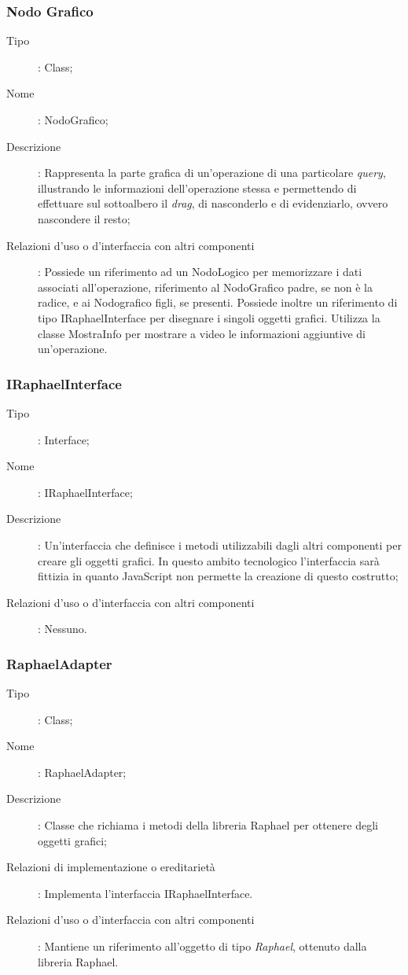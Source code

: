 \subsubsection{Nodo Grafico}
\begin{description}
\item[Tipo]: Class;
\item[Nome]: NodoGrafico;
\item[Descrizione]: Rappresenta la parte grafica di un'operazione di una particolare \textit{query}, illustrando le informazioni dell'operazione stessa e permettendo di effettuare sul sottoalbero il \textit{drag}, di nasconderlo e di evidenziarlo, ovvero nascondere il resto;
\item[Relazioni d'uso o d'interfaccia con altri componenti]: Possiede un riferimento ad un NodoLogico per memorizzare i dati associati all'operazione, riferimento al NodoGrafico padre, se non è la radice, e ai Nodografico figli, se presenti. Possiede inoltre un riferimento di tipo IRaphaelInterface per disegnare i singoli oggetti grafici. Utilizza la classe MostraInfo per mostrare a video le informazioni aggiuntive di un'operazione.
\end{description}
\subsubsection{IRaphaelInterface}
\begin{description}
\item[Tipo]: Interface;
\item[Nome]: IRaphaelInterface;
\item[Descrizione]: Un'interfaccia che definisce i metodi utilizzabili dagli altri componenti per creare gli oggetti grafici. In questo ambito tecnologico l'interfaccia sarà fittizia in quanto JavaScript non permette la creazione di questo costrutto;
\item[Relazioni d'uso o d'interfaccia con altri componenti]: Nessuno.
\end{description}
\subsubsection{RaphaelAdapter}
\begin{description}
\item[Tipo]: Class;
\item[Nome]: RaphaelAdapter;
\item[Descrizione]: Classe che richiama i metodi della libreria Raphael per ottenere degli oggetti grafici;
\item[Relazioni di implementazione o ereditarietà]: Implementa l'interfaccia IRaphaelInterface.
\item[Relazioni d'uso o d'interfaccia con altri componenti]: Mantiene un riferimento all'oggetto di tipo \textit{Raphael}, ottenuto dalla libreria Raphael.
\end{description}
